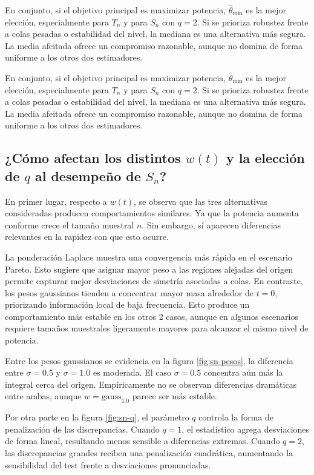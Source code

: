 En conjunto, si el objetivo principal es maximizar potencia, \(\hat\theta_{\min}\) es la mejor elección, especialmente para \(T_n\) y para \(S_n\) con \(q=2\). Si se prioriza robustez frente a colas pesadas o estabilidad del nivel, la mediana es una alternativa más segura. La media afeitada ofrece un compromiso razonable, aunque no domina de forma uniforme a los otros dos estimadores.

En conjunto, si el objetivo principal es maximizar potencia, \(\hat\theta_{\min}\) es la mejor elección, especialmente para \(T_n\) y para \(S_n\) con \(q=2\). Si se prioriza robustez frente a colas pesadas o estabilidad del nivel, la mediana es una alternativa más segura. La media afeitada ofrece un compromiso razonable, aunque no domina de forma uniforme a los otros dos estimadores.



\subsection{¿Cómo afectan los distintos $w(t)$ y la elección de $q$ al desempeño de $S_n$?}

En primer lugar, respecto a \(w(t)\), se observa que las tres alternativas consideradas producen comportamientos similares. Ya que la potencia aumenta conforme crece el tamaño muestral \(n\). Sin embargo, sí aparecen diferencias relevantes en la rapidez con que esto ocurre.

La ponderación Laplace muestra una convergencia más rápida en el escenario Pareto. Esto sugiere que asignar mayor peso a las regiones alejadas del origen permite capturar mejor desviaciones de simetría asociadas a colas. En contraste, los pesos gaussianos tienden a concentrar mayor masa alrededor de \(t=0\), priorizando información local de baja frecuencia. Esto produce un comportamiento más estable en los otros 2 casos, aunque en algunos escenarios requiere tamaños muestrales ligeramente mayores para alcanzar el mismo nivel de potencia.

Entre los pesos gaussianos se evidencia en la figura \ref{fig:sn-pesos}, la diferencia entre \(\sigma=0.5\) y \(\sigma=1.0\) es moderada. El caso \(\sigma=0.5\) concentra aún más la integral cerca del origen. Empíricamente no se observan diferencias dramáticas entre ambas, aunque \(w=\mathrm{gauss}_{1.0}\) parece ser más estable.


Por otra parte en la figura \ref{fig:sn-q}, el parámetro \(q\) controla la forma de penalización de las discrepancias. Cuando \(q=1\), el estadístico agrega desviaciones de forma lineal, resultando menos sensible a diferencias extremas. Cuando \(q=2\), las discrepancias grandes reciben una penalización cuadrática, aumentando la sensibilidad del test frente a desviaciones pronunciadas. 

